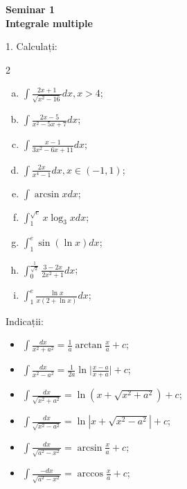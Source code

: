 \documentclass[11pt,a4paper]{article}
\newcommand\ds{\displaystyle}
\theoremstyle{dotless}
\theoremstyle{dotlessdr}
\begin{document}
\begin{center}
  {\large\textbf{Seminar 1 \\ Integrale multiple}}
\end{center}


\vspace{2cm}


1.  Calculați:
\begin{multicols}{2}
  \begin{enumerate}[(a)]
  \item $\ds\int \frac{2x + 1}{\sqrt{x^2 - 16}} dx, x > 4$;
  \item $\ds\int \frac{2x - 5}{x^2 - 5x + 7} dx$;
  \item $\ds\int \frac{x - 1}{3x^2 - 6x + 11} dx$;
  \item $\ds\int \frac{2x}{x^4 - 1} dx, x \in (-1, 1)$;
  \item $\ds\int \arcsin x dx$;
  \item $\ds\int_1^{\sqrt{e}} x \log_3 x dx$;
  \item $\ds\int_1^e \sin(\ln x) dx$;
  \item $\ds\int_0^{\frac{1}{\sqrt{2}}} \frac{3 - 2x}{2x^2 + 1} dx$;
  \item $\ds\int_1^e \frac{\ln x}{x(2 + \ln x)} dx$;
  \end{enumerate}
\end{multicols}

Indicații:
\begin{itemize}
\item $\ds\int \frac{dx}{x^2 + a^2} = \frac{1}{a} \arctan \frac{x}{a} + c$;
\item $\ds\int \frac{dx}{x^2 - a^2} = \frac{1}{2a} \ln \Big| \frac{x - a}{x + a} \Big| + c$;
\item $\ds\int \frac{dx}{\sqrt{x^2 + a^2}} = \ln(x + \sqrt{x^2 + a^2}) + c$;
\item $\ds\int \frac{dx}{\sqrt{x^2 - a^2}} = \ln|x + \sqrt{x^2 - a^2}| + c$;
\item $\ds\int \frac{dx}{\sqrt{a^2 - x^2}} = \arcsin \frac{x}{a} + c$;
\item $\ds\int \frac{-dx}{\sqrt{a^2 - x^2}} = \arccos \frac{x}{a} + c$;
\end{itemize}


\vspace{1cm}
\end{document}
